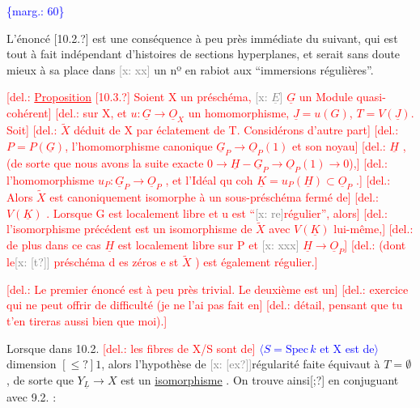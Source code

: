 \documentclass[11pt]{article}
\newcommand{\scanpage}[1]{\par\bigskip\noindent{\small\sffamily[scan #1]}\par}
\newcommand{\mspage}[1]{{\small\sffamily[p.\,#1]}}
\newcommand{\inserted}[2][]{\textcolor{blue}{$\langle$#2$\rangle$}}
\newcommand{\margin}[1]{\textcolor{blue}{\{\textsf{marg.:} #1\}}}
\newcommand{\deleted}[1]{\textcolor{red}{[\textsf{del.:} #1]}}
\newcommand{\xout}[1]{\textcolor{gray}{[\textsf{x:} #1]}}
\newcommand{\uline}[1]{\underline{#1}}
\newcommand{\unsure}[1]{[#1?]}
\begin{document}
\margin{60}

\clearpage
\scanpage{25/61}
\mspage{56}

L'énoncé \unsure{10.2.} est une conséquence à peu près immédiate du suivant,
qui est tout à fait indépendant d'histoires de sections hyperplanes, et
serait sans doute mieux à sa place dans \xout{xx} un nº en rabiot aux
``immersions régulières''.

\deleted{\uline{Proposition} \unsure{10.3.} Soient X un préschéma, \xout{$\underline{E}$} $\underline{G}$ un Module quasi-cohérent}
\deleted{sur X, et $u\colon \underline{G}\to\underline{O}_X$ un homomorphisme, $\underline{J} = u(G)$, $T=V(\underline{J})$. Soit}
\deleted{$\widetilde{X}$ déduit de X par éclatement de T. Considérons d'autre part}
\deleted{$P = P(\underline{G})$, l'homomorphisme canonique $\underline{G}_P\to\underline{O}_P(1)$ et son noyau}
\deleted{$\underline{H}$ ,(de sorte que nous avons la suite exacte $0\to\underline{H}-\underline{G}_P\to\underline{O}_P(1)\to 0$),}
\deleted{l'homomorphisme $u_P : \underline{G}_P \to \underline{O}_P$ , et l'Idéal qu coh $\underline{K} = u_P(\underline{H})\subset\underline{O}_P$ .}
\deleted{Alors $\widetilde{X}$ est canoniquement isomorphe à un sous-préschéma fermé de}
\deleted{$V(\underline{K})$ . Lorsque G est localement libre et u est ``\xout{re}régulier'', alors}
\deleted{l'isomorphisme précédent est un isomorphisme de $\widetilde{X}$ avec $V(\underline{K})$ lui-même,}
\deleted{de plus dans ce cas $\underline{H}$ est localement libre sur P et \xout{xxx} $\underline{H}\to\underline{O}_P$}
\deleted{(dont le\xout{\unsure{t}} préschéma d es zéros e st $\widetilde{X}$ ) est également régulier.}

\deleted{Le premier énoncé est à peu près trivial. Le deuxième est un}
\deleted{exercice qui ne peut offrir de difficulté (je ne l'ai pas fait en}
\deleted{détail, pensant que tu t'en tireras aussi bien que moi).}

Lorsque dans 10.2. \deleted{les fibres de X/S sont de} \inserted{$S = \mathrm{Spec}\,k$ et X est de} dimension $\unsure{\leqslant}1$,
alors l'hypothèse de \xout{\unsure{ex}}régularité faite équivaut à $T = \emptyset$ , de sorte
que $Y_{\underline{L}}\to X$ est un \uline{isomorphisme} . On trouve ainsi\unsure{;} en conjuguant
avec 9.2. :
\end{document}
